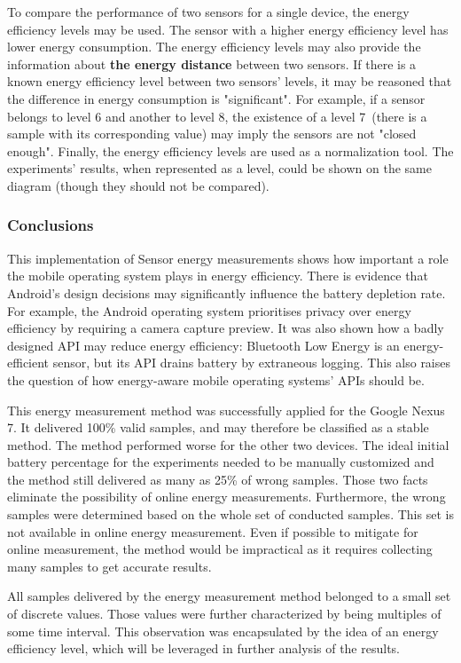 To compare the performance of two sensors for a single device, the energy efficiency levels may be used. The sensor with a higher energy efficiency level has lower energy consumption. The energy efficiency levels may also provide the information about \textbf{the energy distance} between two sensors. If there is a known energy efficiency level between two sensors' levels, it may be reasoned that the difference in energy consumption is "significant". For example, if a sensor belongs to level 6 and another to level 8, the existence of a level 7\ (there is a sample with its corresponding value) may imply the sensors are not "closed enough". Finally, the energy efficiency levels are used as a normalization tool. The experiments' results, when represented as a level, could be shown on the same diagram (though they should not be compared). 
   
\subsubsection{Conclusions}   
\hspace{10pt} This implementation of Sensor energy measurements shows how important a role the mobile operating system plays in energy efficiency. There is evidence that Android's design decisions may significantly influence the battery depletion rate. For example, the Android operating system prioritises privacy over energy efficiency by requiring a camera capture preview. It was also shown how a badly designed API may reduce energy efficiency: Bluetooth Low Energy is an energy-efficient sensor, but its API drains battery by extraneous logging. This also raises the question of how energy-aware mobile operating systems' APIs should be.

This energy measurement method was successfully applied for the Google Nexus 7. It delivered 100\% valid samples, and may therefore be classified as a stable method. The method performed worse for the other two devices. The ideal initial battery percentage for the experiments needed to be manually customized and the method still delivered as many as 25\% of wrong samples. Those two facts eliminate the possibility of online energy measurements. Furthermore, the wrong samples were determined based on the whole set of conducted samples. This set is not available in online energy measurement. Even if possible to mitigate for online measurement, the method would be impractical as it requires collecting many samples to get accurate results.  

All samples delivered by the energy measurement method belonged to a small set of discrete values. Those values were further characterized by being multiples of some time interval. This observation was encapsulated by the idea of an energy efficiency level, which will be leveraged in further analysis of the results. 

